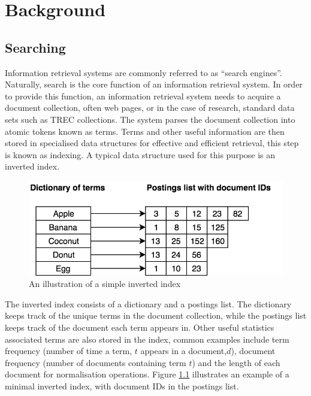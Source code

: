 \chapter{Background}
\label{chap:lit}




\section{Searching}

Information retrieval systems are commonly referred to as ``search engines''. Naturally, search is the core function of an information retrieval system. In order to provide this function, an information retrieval system needs to acquire a document collection, often web pages, or in the case of research, standard data sets such as TREC collections. The system parses the document collection into atomic tokens known as terms. Terms and other useful information are then stored in specialised data structures for effective and efficient retrieval, this step is known as indexing. A typical data structure used for this purpose is an inverted index. 



\begin{figure}
	\centering
	\includegraphics[width=0.7\linewidth]{images/chapter_2/inverted_index}
	\caption{An illustration of a simple inverted index}
	\label{fig:invertedindex}
\end{figure}



The inverted index consists of a dictionary and a postings list. The dictionary keeps track of the unique terms in the document collection, while the postings list keeps track of the document each term appears in. Other useful statistics associated terms are also stored in the index, common examples include term frequency (number of time a term, $t$ appears in a document,$d$), document frequency (number of documents containing term $t$) and the length of each document for normalisation operations. Figure \ref{fig:invertedindex} illustrates an  example of a minimal inverted index, with document IDs in the postings list. 

